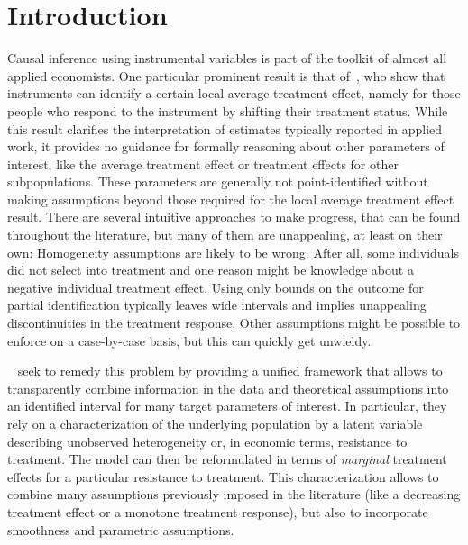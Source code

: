 \documentclass[12pt,a4paper,english]{article} %
\numberwithin{equation}{section}
\theoremstyle{definition}
\theoremstyle{remark}
\theoremstyle{plain}
\begin{document}
\clearpage
\newpage

\tableofcontents

\clearpage
\newpage



\listoffigures

\clearpage
\newpage

\section{Introduction}\label{sec:introduction}
Causal inference using instrumental variables is part of the toolkit of almost all applied economists.
One particular prominent result is that of~\cite{imbens_angrist1994ecma}, who show that instruments can identify a certain local average treatment effect, namely for those people who respond to the instrument by shifting their treatment status.
While this result clarifies the interpretation of estimates typically reported in applied work, it provides no guidance for formally reasoning about other parameters of interest, like the average treatment effect or treatment effects for other subpopulations.
These parameters are generally not point-identified without making assumptions beyond those required for the local average treatment effect result.
There are several intuitive approaches to make progress, that can be found throughout the literature, but many of them are unappealing, at least on their own:
Homogeneity assumptions are likely to be wrong. After all, some individuals did not select into treatment and one reason might be knowledge about a negative individual treatment effect.
Using only bounds on the outcome for partial identification typically leaves wide intervals and implies unappealing discontinuities in the treatment response.
Other assumptions might be possible to enforce on a case-by-case basis, but this can quickly get unwieldy.

~\cite{mogstad2018using} seek to remedy this problem by providing a unified framework that allows to transparently combine
information in the data and theoretical assumptions into an identified interval for many target parameters of interest.
In particular, they rely on a characterization of the underlying population by a latent variable describing unobserved heterogeneity or, in economic terms, resistance to treatment.
The model can then be reformulated in terms of \textit{marginal} treatment effects for a particular resistance to treatment.
This characterization allows to combine many assumptions previously imposed in the literature (like a decreasing treatment effect or a monotone treatment response), but also to incorporate smoothness and parametric assumptions.
\end{document}

